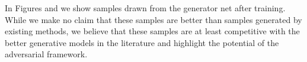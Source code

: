 In Figures %
and %
we show samples drawn from the generator net after training. While we make no claim that these samples are better than samples generated by existing methods, we believe that these samples are at least competitive with the better generative models in the literature and highlight the potential of the adversarial framework.

